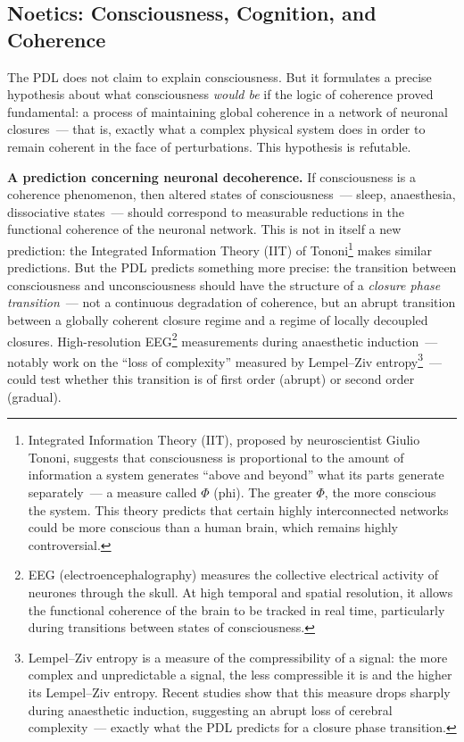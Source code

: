 \documentclass[12pt, a4paper, openright]{book}
\begin{document}
\subsection*{Noetics: Consciousness, Cognition, and Coherence}

The PDL does not claim to explain consciousness. But it formulates a precise hypothesis about what consciousness \emph{would be} if the logic of coherence proved fundamental: a process of maintaining global coherence in a network of neuronal closures~--- that is, exactly what a complex physical system does in order to remain coherent in the face of perturbations. This hypothesis is refutable.

\medskip

\textbf{A prediction concerning neuronal decoherence.} If consciousness is a coherence phenomenon, then altered states of consciousness~--- sleep, anaesthesia, dissociative states~--- should correspond to measurable reductions in the functional coherence of the neuronal network. This is not in itself a new prediction: the Integrated Information Theory (IIT) of Tononi\footnote{Integrated Information Theory (IIT), proposed by neuroscientist Giulio Tononi, suggests that consciousness is proportional to the amount of information a system generates ``above and beyond'' what its parts generate separately~--- a measure called $\Phi$ (phi). The greater $\Phi$, the more conscious the system. This theory predicts that certain highly interconnected networks could be more conscious than a human brain, which remains highly controversial.} makes similar predictions. But the PDL predicts something more precise: the transition between consciousness and unconsciousness should have the structure of a \emph{closure phase transition}~--- not a continuous degradation of coherence, but an abrupt transition between a globally coherent closure regime and a regime of locally decoupled closures. High-resolution EEG\footnote{EEG (electroencephalography) measures the collective electrical activity of neurones through the skull. At high temporal and spatial resolution, it allows the functional coherence of the brain to be tracked in real time, particularly during transitions between states of consciousness.} measurements during anaesthetic induction~--- notably work on the ``loss of complexity'' measured by Lempel--Ziv entropy\footnote{Lempel--Ziv entropy is a measure of the compressibility of a signal: the more complex and unpredictable a signal, the less compressible it is and the higher its Lempel--Ziv entropy. Recent studies show that this measure drops sharply during anaesthetic induction, suggesting an abrupt loss of cerebral complexity~--- exactly what the PDL predicts for a closure phase transition.}~--- could test whether this transition is of first order (abrupt) or second order (gradual).
\end{document}
